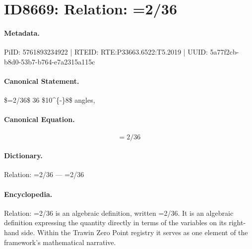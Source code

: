 \section*{ID8669: Relation: =2/36}
\paragraph{Metadata.}
PiID: 5761893234922 | RTEID: RTE:P33663.6522:T5.2019 | UUID: 5a77f2cb-b8d0-53b7-b764-e7a2315a115c

\paragraph{Canonical Statement.}
\$=2/36\$ 36 \$10\textasciicircum{}\{-\}8\$ angles,

\paragraph{Canonical Equation.}
\[
=2/36
\]

\paragraph{Dictionary.}
Relation: =2/36 — =2/36

\paragraph{Encyclopedia.}
Relation: =2/36 is an algebraic definition, written =2/36. It is an algebraic definition expressing the quantity directly in terms of the variables on its right-hand side. Within the Trawin Zero Point registry it serves as one element of the framework's mathematical narrative.
